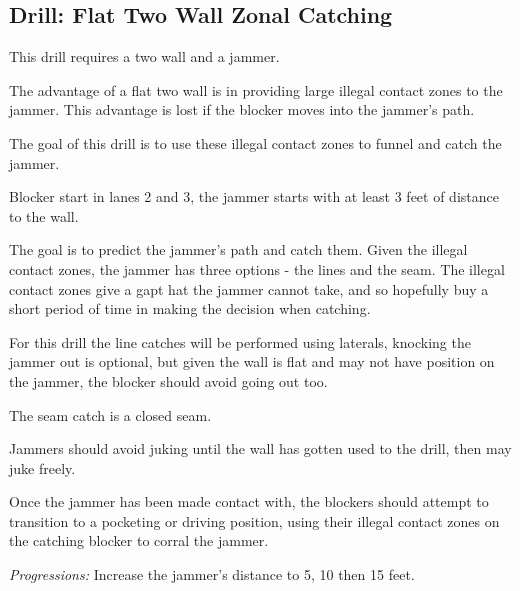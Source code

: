 \subsection*{Drill: Flat Two Wall Zonal Catching}
\label{drill:two_wall/flat_zonal_catch}

This drill requires a two wall and a jammer. 

The advantage of a flat two wall is in providing large illegal contact zones to the jammer.
This advantage is lost if the blocker moves into the jammer's path. 

The goal of this drill is to use these illegal contact zones to funnel and catch the jammer.

Blocker start in lanes 2 and 3, the jammer starts with at least 3 feet of distance to the wall.  

The goal is to predict the jammer's path and catch them. 
Given the illegal contact zones, the jammer has three options - the lines and the seam.
The illegal contact zones give a gapt hat the jammer cannot take, and so hopefully buy a short period of time in making the decision when catching. 

For this drill the line catches will be performed using laterals, knocking the jammer out is optional, but given the wall is flat and may not have position on the jammer, the blocker should avoid going out too.  

The seam catch is a closed seam.

Jammers should avoid juking until the wall has gotten used to the drill, then may juke freely.

Once the jammer has been made contact with, the blockers should attempt to transition to a pocketing or driving position, using their illegal contact zones on the catching blocker to corral the jammer. 


{\it Progressions:} Increase the jammer's distance to 5, 10 then 15 feet.



